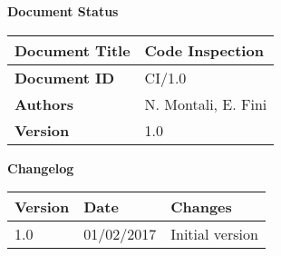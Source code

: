 \textbf{\Huge Document Status}
\begin{center}
    \begin{tabular}{ | l | p{10cm} |}
    \hline
    \textbf{Document Title} & Code Inspection \\ \hline
    \textbf{Document ID} & CI/1.0 \\ \hline
    \textbf{Authors} & N. Montali, E. Fini \\ \hline
    \textbf{Version} & 1.0 \\ \hline
    \end{tabular}
\textbf{\Large Changelog}
     \begin{tabular}{ | l | l | p{10cm} |}
    \hline
    \textbf{Version} & \textbf{Date} & \textbf{Changes} \\ \hline
    1.0 & 01/02/2017 & Initial version \\ \hline
    \end{tabular}
\end{center}
